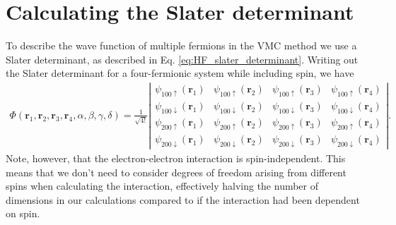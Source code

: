 
\section{Calculating the Slater determinant}
	\label{sec:slaterdeterminant}

		
		To describe the wave function of multiple fermions in the VMC method we use a Slater
		determinant, as described in Eq. \eqref{eq:HF_slater_determinant}. Writing out the Slater determinant for a four-fermionic system while including spin, we have
		\begin{align}
			\Phi(\mathbf{r}_{1},\mathbf{r}_{2},\mathbf{r}_{3},\mathbf{r}_{4},\alpha,\beta,\gamma,\delta)=\frac{1}{\sqrt{4!}}\left|\begin{array}{cccc}
			\psi_{100\uparrow}(\mathbf{r}_{1}) & \psi_{100\uparrow}(\mathbf{r}_{2}) & \psi_{100\uparrow}(\mathbf{r}_{3}) & \psi_{100\uparrow}(\mathbf{r}_{4})\\
			\psi_{100\downarrow}(\mathbf{r}_{1}) & \psi_{100\downarrow}(\mathbf{r}_{2}) & \psi_{100\downarrow}(\mathbf{r}_{3}) & \psi_{100\downarrow}(\mathbf{r}_{4})\\
			\psi_{200\uparrow}(\mathbf{r}_{1}) & \psi_{200\uparrow}(\mathbf{r}_{2}) & \psi_{200\uparrow}(\mathbf{r}_{3}) & \psi_{200\uparrow}(\mathbf{r}_{4})\\
			\psi_{200\downarrow}(\mathbf{r}_{1}) & \psi_{200\downarrow}(\mathbf{r}_{2}) & \psi_{200\downarrow}(\mathbf{r}_{3}) & \psi_{200\downarrow}(\mathbf{r}_{4})
			\end{array}\right|.
		\end{align}
		Note, however, that the electron-electron interaction is spin-independent. This means that we don't need to consider degrees of freedom arising from different spins when calculating the interaction, effectively halving the number of dimensions in our calculations compared to if the interaction had been dependent on spin. 

